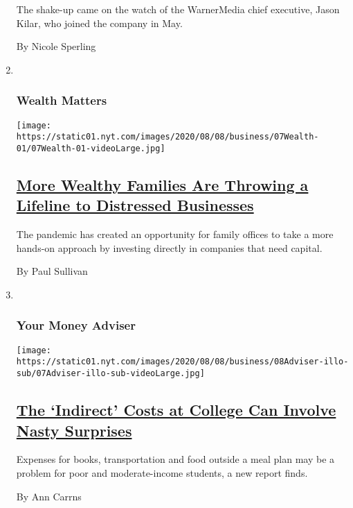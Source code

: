 \begin{enumerate}
  The shake-up came on the watch of the WarnerMedia chief executive,
  Jason Kilar, who joined the company in May.

  By Nicole Sperling
\item ~
  \hypertarget{wealth-matters}{%
  \subsubsection{Wealth Matters}\label{wealth-matters}}

  \texttt{[image: https://static01.nyt.com/images/2020/08/08/business/07Wealth-01/07Wealth-01-videoLarge.jpg]}

  \hypertarget{more-wealthy-families-are-throwing-a-lifeline-to-distressed-businesses}{%
  \subsection{\texorpdfstring{\href{/2020/08/07/your-money/family-office-direct-investment.html}{More
  Wealthy Families Are Throwing a Lifeline to Distressed
  Businesses}}{More Wealthy Families Are Throwing a Lifeline to Distressed Businesses}}\label{more-wealthy-families-are-throwing-a-lifeline-to-distressed-businesses}}

  The pandemic has created an opportunity for family offices to take a
  more hands-on approach by investing directly in companies that need
  capital.

  By Paul Sullivan
\item ~
  \hypertarget{your-money-adviser}{%
  \subsubsection{Your Money Adviser}\label{your-money-adviser}}

  \texttt{[image: https://static01.nyt.com/images/2020/08/08/business/08Adviser-illo-sub/07Adviser-illo-sub-videoLarge.jpg]}

  \hypertarget{the-indirect-costs-at-college-can-involve-nasty-surprises}{%
  \subsection{\texorpdfstring{\href{/2020/08/07/your-money/college-costs-tuition.html}{The
  `Indirect' Costs at College Can Involve Nasty
  Surprises}}{The `Indirect' Costs at College Can Involve Nasty Surprises}}\label{the-indirect-costs-at-college-can-involve-nasty-surprises}}

  Expenses for books, transportation and food outside a meal plan may be
  a problem for poor and moderate-income students, a new report finds.

  By Ann Carrns
\end{enumerate}

